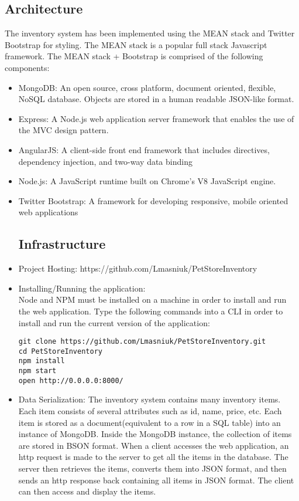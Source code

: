 \documentclass[letterpaper, 12pt]{article}
\begin{document}
\subsection{Architecture}
\noindent The inventory system has been implemented using the MEAN stack and Twitter Bootstrap for styling. The MEAN stack is a popular full stack Javascript framework. The MEAN stack + Bootstrap is comprised of the following components:
\begin{itemize}
\item MongoDB: An open source, cross platform, document oriented, flexible, NoSQL database. Objects are stored in a human readable JSON-like format.
\item Express: A Node.js web application server framework that enables the use of the MVC design pattern.
\item AngularJS: A client-side front end framework that includes directives, dependency injection, and two-way data binding
\item Node.js: A JavaScript runtime built on Chrome's V8 JavaScript engine.
\item Twitter Bootstrap: A framework for developing responsive, mobile oriented web applications

\subsection{Infrastructure}

\item Project Hosting:
 https://github.com/Lmasniuk/PetStoreInventory

\item Installing/Running the application: \\
Node and NPM must be installed on a machine in order to install and run the web application. Type the following commands into a CLI in order to install and run the current version of the application:
\begin{verbatim}
git clone https://github.com/Lmasniuk/PetStoreInventory.git
cd PetStoreInventory
npm install
npm start
open http://0.0.0.0:8000/
\end{verbatim}

\item Data Serialization:
The inventory system contains many inventory items. Each item consists of several attributes such as id, name, price, etc. Each item is stored as a document(equivalent to a row in a SQL table) into an instance of MongoDB. Inside the MongoDB instance, the collection of items are stored in BSON format. When a client accesses the web application, an http request is made to the server to get all the items in the database. The server then retrieves the items, converts them into JSON format, and then sends an http response back containing all items in JSON format. The client can then access and display the items. 



\end{itemize}
\end{document}
